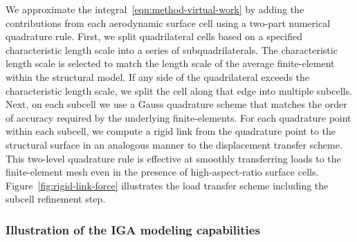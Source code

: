 \documentclass[]{aiaa-tc}
\begin{document}
We approximate the integral~\eqref{eqn:method-virtual-work} by adding the
contributions from each aerodynamic surface cell using a two-part
numerical quadrature rule. First, we split quadrilateral cells based
on a specified characteristic length scale into a series of
subquadrilaterals. The characteristic length scale is selected to
match the length scale of the average finite-element within the
structural model. If any side of the quadrilateral exceeds the
characteristic length scale, we split the cell along that edge into
multiple subcells. Next, on each subcell we use a Gauss quadrature
scheme that matches the order of accuracy required by the underlying
finite-elements. For each quadrature point within each subcell, we
compute a rigid link from the quadrature point to the structural
surface in an analogous manner to the displacement transfer
scheme. This two-level quadrature rule is effective at smoothly
transferring loads to the finite-element mesh even in the presence of
high-aspect-ratio surface cells. Figure~\ref{fig:rigid-link-force}
illustrates the load transfer scheme including the subcell refinement
step.

\subsubsection{Illustration of the IGA modeling capabilities}


\end{document}

